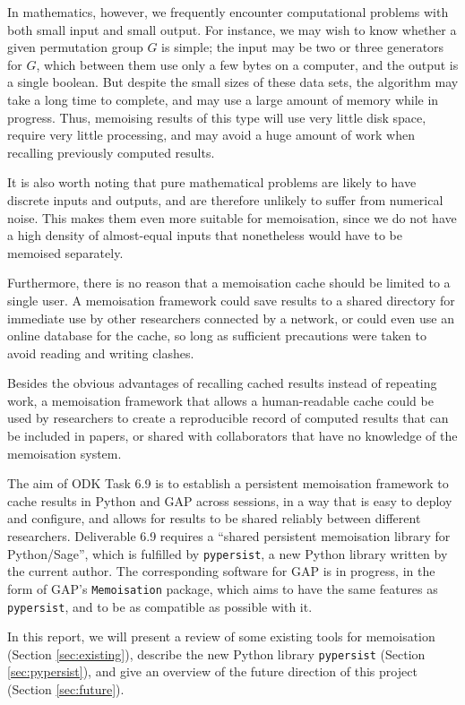 \documentclass{deliverablereport}
\newcommand{\pypersist}{\texttt{pypersist}}
\begin{document}
In mathematics, however, we frequently encounter computational problems with
both small input and small output.  For instance, we may wish to know whether a
given permutation group $G$ is simple; the input may be two or three generators
for $G$, which between them use only a few bytes on a computer, and the output
is a single boolean.  But despite the small sizes of these data sets, the
algorithm may take a long time to complete, and may use a large amount of memory
while in progress.  Thus, memoising results of this type will use very little
disk space, require very little processing, and may avoid a huge amount of work
when recalling previously computed results.

It is also worth noting that pure mathematical problems are likely to have
discrete inputs and outputs, and are therefore unlikely to suffer from numerical
noise.  This makes them even more suitable for memoisation, since we do not have
a high density of almost-equal inputs that nonetheless would have to be memoised
separately.

Furthermore, there is no reason that a memoisation cache should be limited to a
single user.  A memoisation framework could save results to a shared directory
for immediate use by other researchers connected by a network, or could even
use an online database for the cache, so long as sufficient precautions were
taken to avoid reading and writing clashes.

Besides the obvious advantages of recalling cached results instead of repeating
work, a memoisation framework that allows a human-readable cache could be used
by researchers to create a reproducible record of computed results that can be
included in papers, or shared with collaborators that have no knowledge of the
memoisation system.

The aim of ODK Task 6.9 is to establish a persistent memoisation framework to
cache results in Python and GAP across sessions, in a way that is easy to deploy
and configure, and allows for results to be shared reliably between different
researchers.  Deliverable 6.9 requires a ``shared persistent memoisation library
for Python/Sage'', which is fulfilled by \pypersist{}, a new Python library
written by the current author.  The corresponding software for GAP is in
progress, in the form of GAP's \texttt{Memoisation} package, which aims to have
the same features as \pypersist{}, and to be as compatible as possible with it.

In this report, we will present a review of some existing tools for memoisation
(Section \ref{sec:existing}), describe the new Python library \pypersist{}
(Section \ref{sec:pypersist}), and give an overview of the future direction of
this project (Section \ref{sec:future}).
\end{document}
